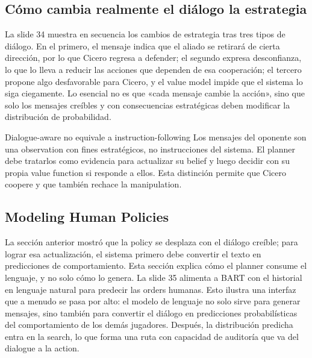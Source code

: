 
\subsection{Cómo cambia realmente el diálogo la estrategia}

La slide 34 muestra en secuencia los cambios de estrategia tras tres tipos de diálogo. En el primero, el mensaje indica que el aliado se retirará de cierta dirección, por lo que Cicero regresa a defender; el segundo expresa desconfianza, lo que lo lleva a reducir las acciones que dependen de esa cooperación; el tercero propone algo desfavorable para Cicero, y el value model impide que el sistema lo siga ciegamente. Lo esencial no es que «cada mensaje cambie la acción», sino que solo los mensajes creíbles y con consecuencias estratégicas deben modificar la distribución de probabilidad.


\begin{importantbox}{Dialogue-aware no equivale a instruction-following}
Los mensajes del oponente son una observation con fines estratégicos, no instrucciones del sistema. El planner debe tratarlos como evidencia para actualizar su belief y luego decidir con su propia value function si responde a ellos. Esta distinción permite que Cicero coopere y que también rechace la manipulation.
\end{importantbox}

\subsection{Modeling Human Policies}

La sección anterior mostró que la policy se desplaza con el diálogo creíble; para lograr esa actualización, el sistema primero debe convertir el texto en predicciones de comportamiento. Esta sección explica cómo el planner consume el lenguaje, y no solo cómo lo genera. La slide 35 alimenta a BART con el historial en lenguaje natural para predecir las orders humanas. Esto ilustra una interfaz que a menudo se pasa por alto: el modelo de lenguaje no solo sirve para generar mensajes, sino también para convertir el diálogo en predicciones probabilísticas del comportamiento de los demás jugadores. Después, la distribución predicha entra en la search, lo que forma una ruta con capacidad de auditoría que va del dialogue a la action.

